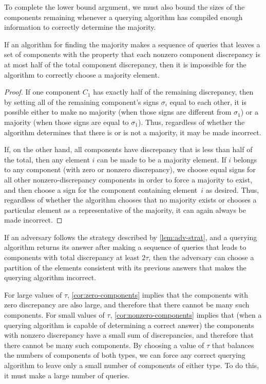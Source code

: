 \documentclass[11pt]{llncs}
\newcommand{\threshold}{\tau}
\begin{document}
To complete the lower bound argument, we must also bound the sizes of the components remaining whenever a querying algorithm has compiled enough information to correctly determine the majority.

\begin{lemma}
If an algorithm for finding the majority makes a sequence of queries that leaves a set of components with the property that each nonzero component discrepancy is at most half of the total component discrepancy, then it is impossible for the algorithm to correctly choose a majority element.
\end{lemma}

\begin{proof}
If one component $C_1$ has exactly half of the remaining discrepancy, then by setting all of the remaining component's signs $\sigma_i$ equal to each other, it is possible either to make no majority (when those signs are different from $\sigma_1$) or a majority (when those signs are equal to $\sigma_1$). Thus, regardless of whether the algorithm determines that there is or is not a majority, it may be made incorrect.

If, on the other hand, all components have discrepancy that is less than half of the total, then any element $i$ can be made to be a majority element. If $i$ belongs to any component (with zero or nonzero discrepancy), we choose equal signs for all other nonzero-discrepancy components in order to force a majority to exist, and then choose a sign for the component containing element~$i$ as desired. Thus, regardless of whether the algorithm chooses that no majority exists or chooses a particular element as a representative of the majority, it can again always be made incorrect.
\end{proof}

\begin{corollary}
\label{cor:nonzero-components}
If an adversary follows the strategy described by \autoref{lem:adv-strat}, and a querying algorithm returns its answer after making a sequence of queries that leads to components with total discrepancy at least $2\threshold$, then the adversary can choose a partition of the elements consistent with its previous answers that makes the querying algorithm incorrect.
\end{corollary}

For large values of $\threshold$, \autoref{cor:zero-components} implies that the components with zero discrepancy are also large, and therefore that there cannot be many such components.
For small values of $\threshold$, \autoref{cor:nonzero-components} implies that (when a querying algorithm is capable of determining a correct answer) the components with nonzero discrepancy have a small sum of discrepancies, and therefore that there cannot be many such components.
By choosing a value of $\threshold$ that balances the numbers of components of both types,
we can force any correct querying algorithm to leave only a small number of components of either type. To do this, it must make a large number of queries.
\end{document}
